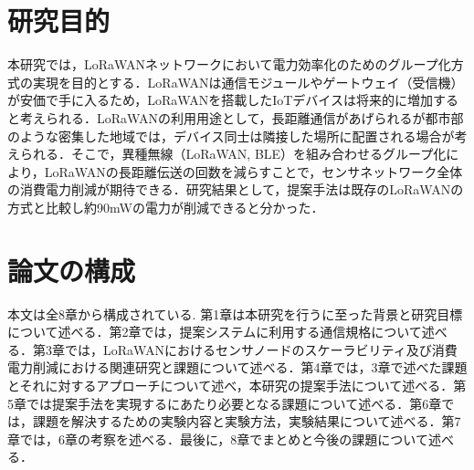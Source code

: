 \section{研究目的}
本研究では，LoRaWANネットワークにおいて電力効率化のためのグループ化方式の実現を目的とする．LoRaWANは通信モジュールやゲートウェイ（受信機）が安価で手に入るため，LoRaWANを搭載したIoTデバイスは将来的に増加すると考えられる．LoRaWANの利用用途として，長距離通信があげられるが都市部のような密集した地域では，デバイス同士は隣接した場所に配置される場合が考えられる．そこで，異種無線（LoRaWAN, BLE）を組み合わせるグループ化により，LoRaWANの長距離伝送の回数を減らすことで，センサネットワーク全体の消費電力削減が期待できる．研究結果として，提案手法は既存のLoRaWANの方式と比較し約90mWの電力が削減できると分かった．

\section{論文の構成}
本文は全8章から構成されている. 第1章は本研究を行うに至った背景と研究目標について述べる．第2章では，提案システムに利用する通信規格について述べる．第3章では，LoRaWANにおけるセンサノードのスケーラビリティ及び消費電力削減における関連研究と課題について述べる．第4章では，3章で述べた課題とそれに対するアプローチについて述べ，本研究の提案手法について述べる．第5章では提案手法を実現するにあたり必要となる課題について述べる．第6章では，課題を解決するための実験内容と実験方法，実験結果について述べる．第7章では，6章の考察を述べる．最後に，8章でまとめと今後の課題について述べる．